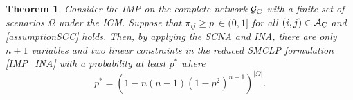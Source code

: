 \documentclass[a4paper,10pt]{article}
\newcommand{\G}{\mathcal{G}}
\theoremstyle{plain}
\newtheorem{theorem}{Theorem}[section]
\newcommand{\revv}[1]{{#1}}
\begin{document}
{		%
		\begin{theorem}
			\label{ERCorollary}
			Consider the IMP on the complete \revv{network} $\mathcal{G}_{\rm {C}}$ with a finite set of scenarios $\Omega$ under the ICM.
			Suppose that $\pi_{ij}\geq  p~\revv{\in (0,1]}$ for all $(i,j) \in \mathcal{A}_{\rm{C}}$ and \eqref{assumptionSCC} holds.
			Then, by applying the SCNA and INA, there are only $n+1$ variables and two linear constraints in the reduced SMCLP formulation \eqref{IMP_INA} with a probability at least $p^*$ where
			\begin{equation}
				\label{defpstar}
				p^*=(1 - n(n-1)(1-p^2)^{n-1})^{|\Omega|}.

\end{equation}
\end{theorem}}
\end{document}
